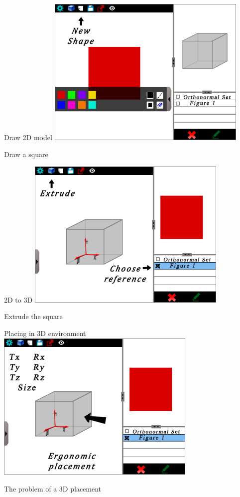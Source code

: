 \documentclass[a4paper,10pt]{beamer}
\begin{document}
			\begin{frame}{Draw 2D model}
				\includegraphics[height=205pt]{maquette/maquette_3.png}
				
				Draw a square
			\end{frame}
			
			\begin{frame}{2D to 3D}
				\includegraphics[height=205pt]{maquette/maquette_4.png}
				
				Extrude the square
			\end{frame}
			
			\begin{frame}{Placing in 3D environment}
				\includegraphics[height=205pt]{maquette/maquette_5.png}
				
				The problem of a 3D placement
			\end{frame}
			
\end{document}
